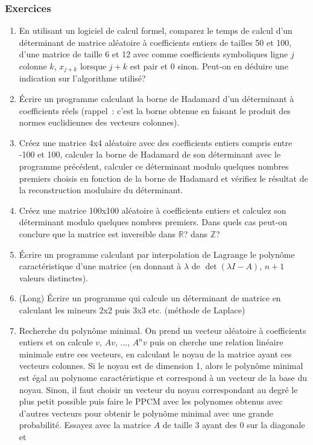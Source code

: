 \documentclass[a4paper,11pt]{article}
\newcommand{\R}{{\mathbb{R}}}
\newcommand{\Z}{{\mathbb{Z}}}
\begin{document}
\begin{giacjshere}
\subsubsection{Exercices}
\begin{enumerate}
\item En utilisant un logiciel de calcul formel,
comparez le temps de calcul d'un d\'eterminant de matrice
al\'eatoire \`a coefficients entiers de tailles 50 et 100, 
d'une matrice de taille 6 et 12 avec comme coefficients symboliques
ligne $j$ colonne $k$, $x_{j+k}$ lorsque $j+k$ est pair
et 0 sinon. Peut-on en déduire une indication sur l'algorithme
utilisé?
\item \'Ecrire un programme calculant la borne de Hadamard d'un
déterminant à coefficients réels (rappel~: c'est la borne obtenue en faisant
le produit des normes euclidiennes des vecteurs colonnes).
\item Créez une matrice 4x4 aléatoire avec des coefficients entiers
compris entre -100 et 100, calculer la borne de Hadamard de son déterminant
avec le programme précédent, calculer ce déterminant modulo
quelques nombres premiers choisis en fonction de la borne de Hadamard
et vérifiez le résultat de la reconstruction modulaire du déterminant.
\item Créez une matrice 100x100 aléatoire à coefficients entiers
et calculez son déterminant
modulo quelques nombres premiers. Dans quels cas peut-on
conclure que la matrice est inversible dans $\R$? dans $\Z$?
\item \'Ecrire un programme calculant par interpolation de Lagrange
le polyn\^ome caract\'eristique d'une matrice (en donnant \`a $\lambda$
de $\det(\lambda I -A)$, $n+1$ valeurs distinctes).
\item (Long) \'Ecrire un programme qui calcule un d\'eterminant de matrice
en calculant les mineurs 2x2 puis 3x3 etc. (m\'ethode de Laplace)
\item Recherche du polynôme minimal. On prend un vecteur aléatoire
à coefficients entiers et on calcule $v$, $Av$, ..., $A^nv$ puis
on cherche une relation linéaire minimale entre ces vecteurs, en
calculant le noyau de la matrice ayant ces vecteurs colonnes. Si le
noyau est de dimension 1, alors le polynôme minimal est égal au
polynome caractéristique et correspond à un vecteur de la base du noyau.
Sinon, il faut choisir un vecteur du noyau correspondant au degré
le plus petit possible puis faire le PPCM avec les polynomes obtenus
avec d'autres vecteurs pour obtenir le polynôme minimal avec une grande
probabilité.
Essayez avec la matrice $A$ de taille 3 ayant des 0 sur la diagonale et 

\end{enumerate}
\end{giacjshere}
\end{document}
